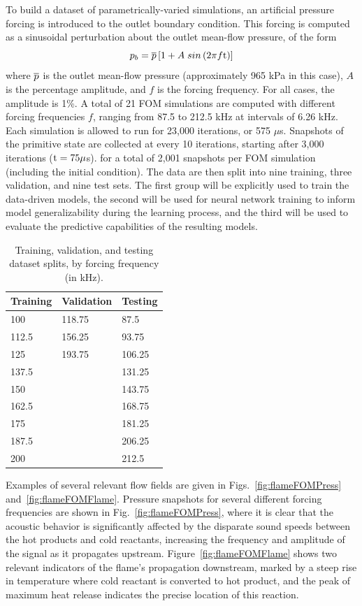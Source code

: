 To build a dataset of parametrically-varied simulations, an artificial pressure forcing is introduced to the outlet boundary condition. This forcing is computed as a sinusoidal perturbation about the outlet mean-flow pressure, of the form
%
\begin{equation}
	p_b = \overline{p} \left[1 + A \; sin\left(2 \pi f \text{t}\right)\right]
\end{equation}
%
where $\overline{p}$ is the outlet mean-flow pressure (approximately 965 kPa in this case), $A$ is the percentage amplitude, and $f$ is the forcing frequency. For all cases, the amplitude is 1\%. A total of 21 FOM simulations are computed with different forcing frequencies $f$, ranging from 87.5 to 212.5 kHz at intervals of 6.26 kHz. Each simulation is allowed to run for 23,000 iterations, or 575 $\mu$s. Snapshots of the primitive state are collected at every 10 iterations, starting after 3,000 iterations ($\text{t} = 75 \mu$s). for a total of 2,001 snapshots per FOM simulation (including the initial condition). The data are then split into nine training, three validation, and nine test sets. The first group will be explicitly used to train the data-driven models, the second will be used for neural network training to inform model generalizability during the learning process, and the third will be used to evaluate the predictive capabilities of the resulting models.

\begin{table}
	\centering
	\begin{tabular}{ lll }
	\toprule
	Training & Validation & Testing  \\
	\midrule
	100   & 118.75 & 87.5 \\
	112.5 & 156.25 & 93.75 \\
	125   & 193.75 & 106.25 \\
	137.5 &        & 131.25 \\
	150   &        & 143.75 \\
	162.5 &        & 168.75 \\
	175   &        & 181.25 \\
	187.5 &        & 206.25 \\
	200   &        & 212.5 \\
	\bottomrule
	\end{tabular}
	\caption{\label{tab:trainSplit}Training, validation, and testing dataset splits, by forcing frequency (in kHz).}
\end{table}

Examples of several relevant flow fields are given in Figs.~\ref{fig:flameFOMPress} and~\ref{fig:flameFOMFlame}. Pressure snapshots for several different forcing frequencies are shown in Fig.~\ref{fig:flameFOMPress}, where it is clear that the acoustic behavior is significantly affected by the disparate sound speeds between the hot products and cold reactants, increasing the frequency and amplitude of the signal as it propagates upstream. Figure~\ref{fig:flameFOMFlame} shows two relevant indicators of the flame's propagation downstream, marked by a steep rise in temperature where cold reactant is converted to hot product, and the peak of maximum heat release indicates the precise location of this reaction. 

